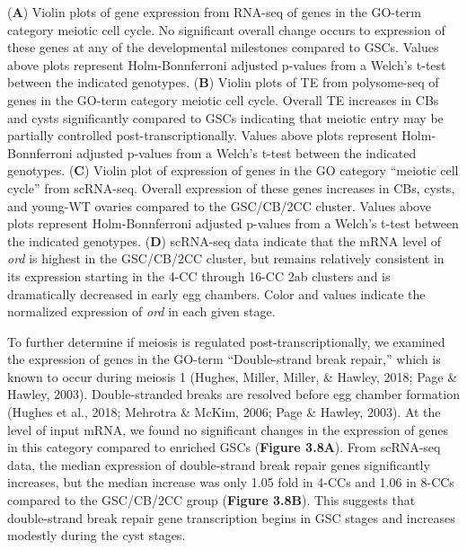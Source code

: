 \documentclass[12pt,oneside]{reedthesis}
\begin{document}
\setlength\parindent{0pt}(\textbf{A}) Violin plots of gene expression from RNA-seq of genes in the GO-term category meiotic cell cycle. No significant overall change occurs to expression of these genes at any of the developmental milestones compared to GSCs. Values above plots represent Holm-Bonnferroni adjusted p-values from a Welch's t-test between the indicated genotypes. (\textbf{B}) Violin plots of TE from polysome-seq of genes in the GO-term category meiotic cell cycle. Overall TE increases in CBs and cysts significantly compared to GSCs indicating that meiotic entry may be partially controlled post-transcriptionally. Values above plots represent Holm-Bonnferroni adjusted p-values from a Welch's t-test between the indicated genotypes. (\textbf{C}) Violin plot of expression of genes in the GO category ``meiotic cell cycle'' from scRNA-seq. Overall expression of these genes increases in CBs, cysts, and young-WT ovaries compared to the GSC/CB/2CC cluster. Values above plots represent Holm-Bonnferroni adjusted p-values from a Welch's t-test between the indicated genotypes. (\textbf{D}) scRNA-seq data indicate that the mRNA level of \emph{ord} is highest in the GSC/CB/2CC cluster, but remains relatively consistent in its expression starting in the 4-CC through 16-CC 2ab clusters and is dramatically decreased in early egg chambers. Color and values indicate the normalized expression of \emph{ord} in each given stage.


To further determine if meiosis is regulated post-transcriptionally, we
examined the expression of genes in the GO-term ``Double-strand break
repair,'' which is known to occur during meiosis 1
(Hughes, Miller, Miller, \& Hawley, 2018; Page \& Hawley, 2003). Double-stranded breaks are
resolved before egg chamber formation
(Hughes et al., 2018; Mehrotra \& McKim, 2006; Page \& Hawley, 2003). At the level of input mRNA,
we found no significant changes in the expression of genes in this
category compared to enriched GSCs (\textbf{Figure 3.8A}). From scRNA-seq data,
the median expression of double-strand break repair genes significantly
increases, but the median increase was only 1.05 fold in 4-CCs and 1.06
in 8-CCs compared to the GSC/CB/2CC group (\textbf{Figure 3.8B}). This suggests
that double-strand break repair gene transcription begins in GSC stages
and increases modestly during the cyst stages.
\end{document}
